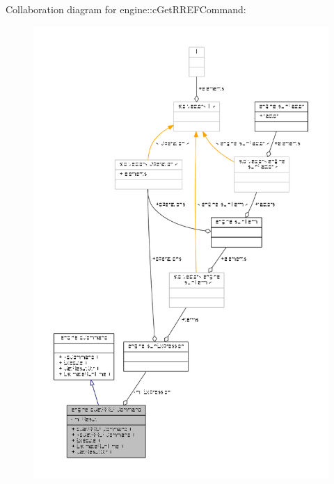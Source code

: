Collaboration diagram for engine\-:\-:c\-Get\-R\-R\-E\-F\-Command\-:
\nopagebreak
\begin{figure}[H]
\begin{center}
\leavevmode
\includegraphics[width=350pt]{classengine_1_1cGetRREFCommand__coll__graph}
\end{center}
\end{figure}
